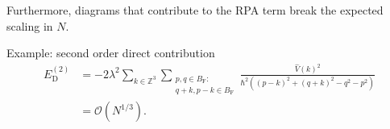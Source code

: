 \documentclass{beamer}
\begin{document}
\begin{frame}
	Furthermore, diagrams that contribute to the RPA term break the expected scaling in $N$.
	\begin{block}{Example: second order direct contribution}
		\begin{align*}
			E_{\mathrm{D}}^{(2)}
			&= -2\lambda^2 \sum_{k\in\mathbb{Z}^3} \sum_{\substack{p,q\in B_{\mathrm{F}}:\\q+k,p-k\in B_{\mathrm{F}}}}
			\frac{\hat{V}(k)^2}{\hbar^2((p-k)^2+(q+k)^2-q^2-p^2)}\\
			&= \mathcal{O}(N^{1/3}).
		\end{align*}
	\end{block}
\end{frame}
\end{document}
